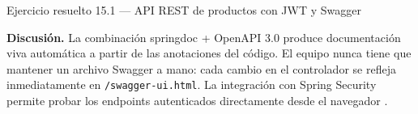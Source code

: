 \begin{cajaejemplo}{Ejercicio resuelto 15.1 --- API REST de productos con JWT y Swagger}
\begin{center}
\end{center}

\textbf{Discusión.} La combinación springdoc + OpenAPI 3.0 produce
documentación viva automática a partir de las anotaciones del código.
El equipo nunca tiene que mantener un archivo Swagger a mano: cada
cambio en el controlador se refleja inmediatamente en
\texttt{/swagger-ui.html}. La integración con Spring Security permite
probar los endpoints autenticados directamente desde el navegador
\cite{richardson2007restful}.
\end{cajaejemplo}

